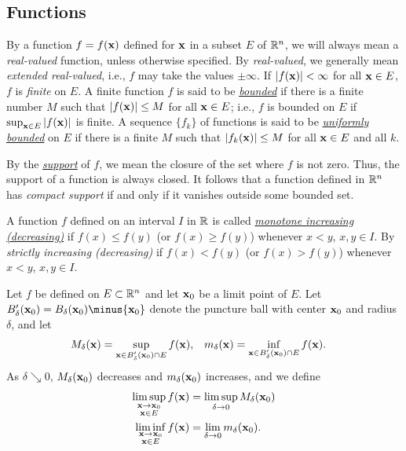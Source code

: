 \subsection{Functions}
By a function $f=f(\mathbf{x})$ defined for $\mathbf{x}$ in a subset $E$ of $\mathbb{R}^n$,
we will always mean a \emph{real-valued} function, unless otherwise
specified. By \emph{real-valued}, we generally mean \emph{extended
  real-valued}, i.e., $f$ may take the values $\pm\infty$. If
$|f(\mathbf{x})|<\infty$ for all $\mathbf{x}\in E$, $f$ is \emph{finite} on $E$. A
finite function $f$ is said to be
\href{https://en.wikipedia.org/wiki/Bounded_function}{\emph{bounded}} if
there is a finite number $M$ such that $|f(\mathbf{x})|\leq M$ for all $\mathbf{x}\in
E$; i.e., $f$ is bounded on $E$ if $\sup_{\mathbf{x}\in E}|f(\mathbf{x})|$ is finite. A
sequence $\{f_k\}$ of functions is said to be
\href{https://en.wikipedia.org/wiki/Uniform_boundedness}{\emph{uniformly
    bounded}} on $E$ if there is a finite $M$ such that $|f_k(\mathbf{x})|\leq M$
for all $\mathbf{x}\in E$ and all $k$.

By the
\href{https://en.wikipedia.org/wiki/Support_(mathematics)}{\emph{support}}
of $f$, we mean the closure of the set where $f$ is not zero. Thus, the
support of a function is always closed. It follows that a function defined
in $\mathbb{R}^n$ has \emph{compact support} if and only if it vanishes outside
some bounded set.

A function $f$ defined on an interval $I$ in $\mathbb{R}$ is called
\href{https://en.wikipedia.org/wiki/Monotonic_function}{\emph{monotone
    increasing (decreasing)}} if $f(x)\leq f(y)$ (or $f(x)\geq f(y)$)
whenever $x<y$, $x,y\in I$. By \emph{strictly increasing (decreasing)} if
$f(x)<f(y)$ (or $f(x)>f(y)$) whenever $x<y$, $x,y\in I$.

Let $f$ be defined on $E\subset\mathbb{R}^n$ and let $\mathbf{x}_0$ be a limit point of
$E$. Let $B_\delta'(\bfx_0)=B_\delta(\bfx_0)\minus\{\bfx_0\}$ denote the
puncture ball with center $\mathbf{x}_0$ and radius $\delta$, and let
\begin{equation}
  \label{eq:1:big-m-lil-m}
  \begin{aligned}
    M_\delta(\mathbf{x})&=\sup_{\mathbf{x}\in B_\delta'(\mathbf{x}_0)\cap E}f(\mathbf{x}),&
    m_\delta(\mathbf{x})&=\inf_{\mathbf{x}\in B_\delta'(\mathbf{x}_0)\cap E}f(\mathbf{x}).
  \end{aligned}
\end{equation}
As $\delta\searrow 0$, $M_\delta(\mathbf{x}_0)$ decreases and $m_\delta(\mathbf{x}_0)$
increases, and we define
\begin{equation}
  \label{eq:1:mdeltas-limsup-liminf}
  \begin{aligned}
    \limsup_{\substack{\mathbf{x}\to\mathbf{x}_0\\\mathbf{x}\in E}}f(\mathbf{x})
    &=\limsup_{\delta\to 0} M_\delta(\mathbf{x}_0)\\
    \liminf_{\substack{\mathbf{x}\to\mathbf{x}_0\\\mathbf{x}\in E}}f(\mathbf{x})
    &=\lim_{\delta\to 0} m_\delta(\mathbf{x}_0).
  \end{aligned}
\end{equation}

